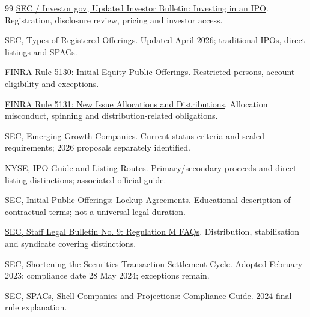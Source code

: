 \documentclass[11pt,a4paper]{article}
\begin{document}
\begin{thebibliography}{99}
 \href{https://www.investor.gov/introduction-investing/general-resources/news-alerts/alerts-bulletins/investor-bulletins-17}{SEC / Investor.gov, Updated Investor Bulletin: Investing in an IPO}. Registration, disclosure review, pricing and investor access.

 \href{https://www.sec.gov/resources-small-businesses/capital-raising-building-blocks/types-registered-offerings}{SEC, Types of Registered Offerings}. Updated April 2026; traditional IPOs, direct listings and SPACs.

 \href{https://www.finra.org/rules-guidance/rulebooks/finra-rules/5130}{FINRA Rule 5130: Initial Equity Public Offerings}. Restricted persons, account eligibility and exceptions.

 \href{https://www.finra.org/rules-guidance/rulebooks/finra-rules/5131}{FINRA Rule 5131: New Issue Allocations and Distributions}. Allocation misconduct, spinning and distribution-related obligations.

 \href{https://www.sec.gov/resources-small-businesses/going-public/emerging-growth-companies}{SEC, Emerging Growth Companies}. Current status criteria and scaled requirements; 2026 proposals separately identified.

 \href{https://www.nyse.com/ipo}{NYSE, IPO Guide and Listing Routes}. Primary/secondary proceeds and direct-listing distinctions; associated official guide.

 \href{https://www.sec.gov/answers/lockup.htm}{SEC, Initial Public Offerings: Lockup Agreements}. Educational description of contractual terms; not a universal legal duration.

 \href{https://www.sec.gov/rules-regulations/staff-guidance/staff-legal-bulletins/staff-legal-bulletin-9-faq-regulation-m}{SEC, Staff Legal Bulletin No. 9: Regulation M FAQs}. Distribution, stabilisation and syndicate covering distinctions.

 \href{https://www.sec.gov/investment/settlement-cycle-small-entity-compliance-guide-15c6-1-15c6-2-204-2}{SEC, Shortening the Securities Transaction Settlement Cycle}. Adopted February 2023; compliance date 28 May 2024; exceptions remain.

 \href{https://www.sec.gov/resources-small-businesses/small-business-compliance-guides/special-purpose-acquisition-companies-shell-companies-projections}{SEC, SPACs, Shell Companies and Projections: Compliance Guide}. 2024 final-rule explanation.


\end{thebibliography}
\end{document}
